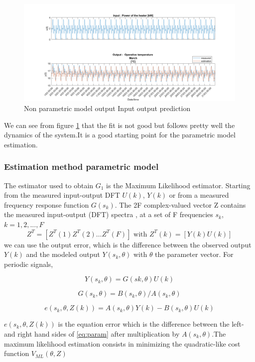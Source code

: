 \documentclass[a4paper,12pt]{article}
\numberwithin{equation}{section}
\begin{document}
\begin{figure}[H]
    \includegraphics[width=\textwidth]{Np_In_oUT.png}
    \centering
    \caption{Non parametric model output Input output prediction}
    \label{fig:Npinputoutput}
\end{figure}

\noindent
We can see from figure \ref{fig:Npinputoutput} that the fit is not good but follows pretty well the dynamics of the system.It is a good starting point for the parametric model estimation.

\subsubsection{Estimation method parametric model}
The estimator used to obtain $G_{1}$ is the Maximum Likelihood estimator. Starting from the measured input-output DFT $U(k)$, $Y(k)$ or from a measured frequency response function $G(s_{k})$. The 2F complex-valued vector Z contains the measured
input-output (DFT) spectra , at a set of F frequencies $s_{k}$, $k = 1, 2, ...,F$
 $$
Z^{T}=\left[Z^{T}(1) Z^{T}(2) \ldots Z^{T}(F)\right] \text { with } Z^{T}(k)=[Y(k) U(k)]
$$
\noindent
we can use the output error, which is the difference between the observed output $Y(k)$ and the modeled output $Y(s_{k},\theta)$ with $\theta$ the parameter vector. For periodic signals,

\begin{equation}\label{eq:param}
Y\left(s_{k}, \theta\right)=G\left(s{k}, \theta\right) U(k)
\end{equation}

$$
G(s_{k}, \theta)=B(s_{k}, \theta) / A(s_{k}, \theta)
$$

$$
e\left(s_{k}, \theta, Z(k)\right)=A\left(s_{k}, \theta\right) Y(k)-B\left(s_{k}, \theta\right) U(k)
$$

\noindent
$e\left(s_{k}, \theta, Z(k)\right)$ is the equation error  which is the difference between the left- and right hand sides of \ref{eq:param}  after multiplication by $A\left(s_{k}, \theta\right)$.The maximum likelihood estimation consists in minimizing the  quadratic-like cost function $V_{ML}(\theta
, Z)$
\end{document}
